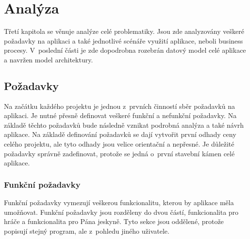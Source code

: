 \documentclass[thesis=B,czech]{resources/FITthesis}[2012/06/26]
\begin{document}
\chapter{Analýza}
Třetí kapitola se věnuje analýze celé problematiky. Jsou zde analyzovány veškeré požadavky na aplikaci a také jednotlivé scénáře využití aplikace, neboli business procesy.  V~poslední části je zde dopodrobna rozebrán datový model celé aplikace a navržen model architektury. 

	\section{Požadavky}
Na začátku každého projektu je jednou z~prvních činností sběr požadavků na aplikaci. Je nutné přesně definovat veškeré funkční a nefunkční požadavky. Na základě těchto požadavků bude následně vznikat podrobná analýza a také návrh aplikace. Na základě definování požadavků se dají vytvořit první odhady ceny celého projektu, ale tyto odhady jsou velice orientační a nepřesné. Je důležité požadavky správně zadefinovat, protože se jedná o~první stavební kámen celé aplikace. 

\subsection{Funkční požadavky}
Funkční požadavky vymezují veškerou funkcionalitu, kterou by aplikace měla umožňovat. Funkční požadavky jsou rozděleny do dvou částí, funkcionalita pro hráče a funkcionalita pro Pána jeskyně. Tyto sekce jsou oddělené, protože popisují stejný program, ale z~pohledu jiného uživatele.
\end{document}
